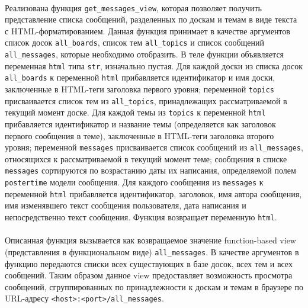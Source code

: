 \documentclass[12pt, a4paper, oneside]{article}
\begin{document}
\paragraph{}
Реализована функция \texttt{get\_messages\_view}, которая позволяет получить представление списка сообщений, разделенных по доскам и темам в виде текста с HTML-форматированием. Данная функция принимает в качестве аргументов список досок \texttt{all\_boards}, список тем \texttt{all\_topics} и список сообщений \texttt{all\_messages}, которые необходимо отобразить. В теле функции объявляется переменная \texttt{html} типа \texttt{str}, изначально пустая. Для каждой доски из списка досок \texttt{all\_boards} к переменной \texttt{html} прибавляется идентификатор и имя доски, заключенные в HTML-теги заголовка первого уровня; переменной \texttt{topics} присваивается список тем из \texttt{all\_topics}, принадлежащих рассматриваемой в текущий момент доске. Для каждой темы из \texttt{topics} к переменной \texttt{html} прибавляется идентификатор и название темы (определяется как заголовок первого сообщения в теме), заключенные в HTML-теги заголовка второго уровня; переменной \texttt{messages} присваивается список сообщений из \texttt{all\_messages}, относящихся к рассматриваемой в текущий момент теме; сообщения в списке \texttt{messages} сортируются по возрастанию даты их написания, определяемой полем \texttt{postertime} модели сообщения. Для каждого сообщения из \texttt{messages} к переменной \texttt{html} прибавляется идентификатор, заголовок, имя автора сообщения, имя изменявшего текст сообщения пользователя, дата написания и непосредственно текст сообщения. Функция возвращает переменную \texttt{html}.
\paragraph{}
Описанная функция вызывается как возвращаемое значение function-based view (представления в функциональном виде) \cite{django-views} \texttt{all\_messages}. В качестве аргументов в функцию передаются списки всех существующих в базе досок, всех тем и всех сообщений. Таким образом данное view предоставляет возможность просмотра сообщений, сгруппированных по принадлежности к доскам и темам в браузере по URL-адресу \texttt{<host>:<port>/all\_messages}.
\end{document}
